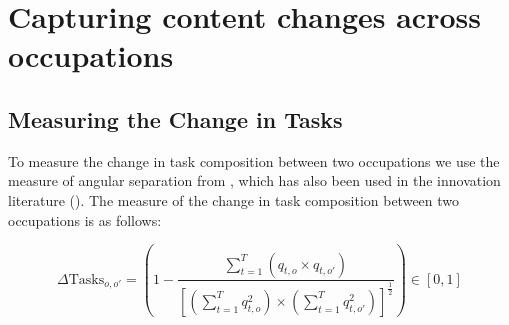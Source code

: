 \documentclass[11pt, oneside]{article}
\begin{document}
\begin{comment}
	\vspace{2mm}
	
	
	Contemporaneously, \cite{Cortes2017} also use the concept of change in task composition which we use here, but within a different context. Instead of taking the change in task composition at face value, they interpret it as the cost of occupational mobility. The main idea is that the larger the change in task composition between two occupations, they greater the cost of moving from one to the other occupation and, as such, the smaller the ratio of movers to stayers. They borrow a gravity model from the trade literature, where job-to-job flows are aggregated at the 2-digit level and are assumed to behave similar to bilateral trade. The traditional geographical distance is replaced with the change in task composition, while destination and origin country fixed effects are now destination and origin 2-digit occupational fixed effects. Thus, their analysis is aggregated at the occupational level, and they find that the ratio of movers to stayers is negatively affected by greater change in task composition. Our approach is different in that we want to understand the effect of business cycles on the distance of occupational moves at the individual level. 
	content...
	\end{comment}
	
	\section{Capturing content changes across occupations}
	\label{sec:measures}
	
	\subsection{Measuring the Change in Tasks}
	\label{sec:taskDistance}
	To measure the change in task composition between two occupations we use the measure of angular separation from \cite{Gathmann2010}, which has also been used in the innovation literature (\cite{Jaffe1986}). The measure of the change in task composition between two occupations is as follows:
	
	
	\begin{equation}
	\label{eq:angSep}
	\Delta \text{Tasks}_{o,o'} = \left(1 - \frac{\sum_{t=1}^{T}(q_{t,o}\times q_{t,o'})}{\left[(\sum_{t=1}^{T}q_{t,o}^{2})\times(\sum_{t=1}^{T}q_{t,o'}^{2})\right]^{\frac{1}{2}}}\right)   \in [0,1]
	\end{equation}
	
\end{document}
